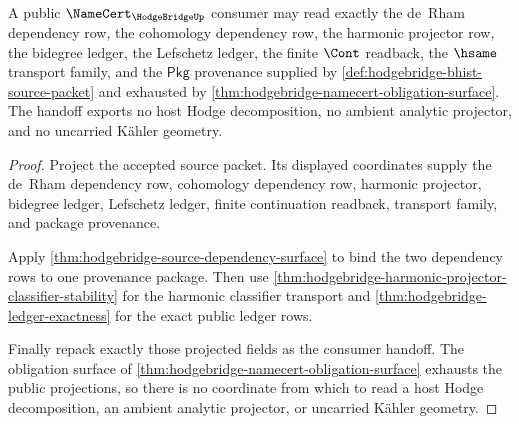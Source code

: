 \begin{theorem}
\label{thm:hodgebridge-public-certificate-handoff}
A public $\NameCert_{\HodgeBridgeUp}$ consumer may read exactly the de~Rham
dependency row, the cohomology dependency row, the harmonic projector row, the
bidegree ledger, the Lefschetz ledger, the finite $\Cont$ readback, the
$\hsame$ transport family, and the $\mathsf{Pkg}$ provenance supplied by
\autoref{def:hodgebridge-bhist-source-packet} and exhausted by
\autoref{thm:hodgebridge-namecert-obligation-surface}. The handoff exports no
host Hodge decomposition, no ambient analytic projector, and no uncarried
K\"{a}hler geometry.
\end{theorem}
\begin{proof}
Project the accepted source packet. Its displayed coordinates supply the
de~Rham dependency row, cohomology dependency row, harmonic projector, bidegree
ledger, Lefschetz ledger, finite continuation readback, transport family, and
package provenance.

Apply \autoref{thm:hodgebridge-source-dependency-surface} to bind the two
dependency rows to one provenance package. Then use
\autoref{thm:hodgebridge-harmonic-projector-classifier-stability} for the
harmonic classifier transport and \autoref{thm:hodgebridge-ledger-exactness}
for the exact public ledger rows.

Finally repack exactly those projected fields as the consumer handoff. The
obligation surface of \autoref{thm:hodgebridge-namecert-obligation-surface}
exhausts the public projections, so there is no coordinate from which to read a
host Hodge decomposition, an ambient analytic projector, or uncarried K\"{a}hler
geometry.
\end{proof}

